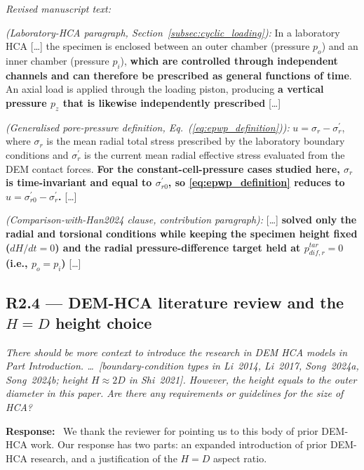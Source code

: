 \documentclass[11pt,a4paper]{article}
\newenvironment{rcomment}
  {\begin{leftbar}\color{black!75}\itshape}
  {\end{leftbar}\vspace{0.3em}}
\newcommand{\response}{\par\noindent\textbf{Response:}\ \ignorespaces}
\newenvironment{revtext}
  {\par\vspace{0.2em}\noindent\textit{Revised manuscript text:}\par
   \begingroup\color{black}\begin{leftbar}\small}
  {\end{leftbar}\endgroup\vspace{0.3em}}
\begin{document}
\begin{revtext}
\textit{(Laboratory-HCA paragraph,
Section~\ref{subsec:cyclic_loading}):} In a laboratory HCA
[\ldots] the specimen is enclosed between an outer chamber (pressure
$p_o$) and an inner chamber (pressure $p_i$), \textbf{which are
controlled through independent channels and can therefore be
prescribed as general functions of time}. An axial load is applied
through the loading piston, producing \textbf{a vertical pressure
$p_z$ that is likewise independently prescribed} [\ldots]
\medskip

\textit{(Generalised pore-pressure definition,
Eq.~(\ref{eq:epwp_definition})):}
\textbf{$u = \sigma_r - \sigma_r^{\prime}$}, where $\sigma_r$ is the
mean radial total stress prescribed by the laboratory boundary
conditions and $\sigma_r^{\prime}$ is the current mean radial
effective stress evaluated from the DEM contact forces. \textbf{For
the constant-cell-pressure cases studied here, $\sigma_r$ is
time-invariant and equal to $\sigma_{r0}^{\prime}$, so
\cref{eq:epwp_definition} reduces to
$u = \sigma_{r0}^{\prime} - \sigma_r^{\prime}$.} [\ldots]
\medskip

\textit{(Comparison-with-Han2024 clause, contribution paragraph):}
[\ldots] \textbf{\citet{Han2024jgs} solved only the radial and
torsional conditions while keeping the specimen height fixed
($dH/dt=0$) and the radial pressure-difference target held at
$p_{dif,r}^{tar}=0$ (i.e., $p_o=p_i$)} [\ldots]
\end{revtext}

\subsection*{R2.4 --- DEM-HCA literature review and the $H=D$ height choice}

\begin{rcomment}
There should be more context to introduce the research in DEM HCA models in
Part Introduction. \dots\ [boundary-condition types in Li~2014, Li~2017,
Song~2024a, Song~2024b; height $H \approx 2D$ in Shi~2021]. However, the
height equals to the outer diameter in this paper. Are there any
requirements or guidelines for the size of HCA?
\end{rcomment}

\response
We thank the reviewer for pointing us to this body of prior DEM-HCA
work. Our response has two parts: an expanded introduction of prior
DEM-HCA research, and a justification of the $H=D$ aspect ratio.
\end{document}
